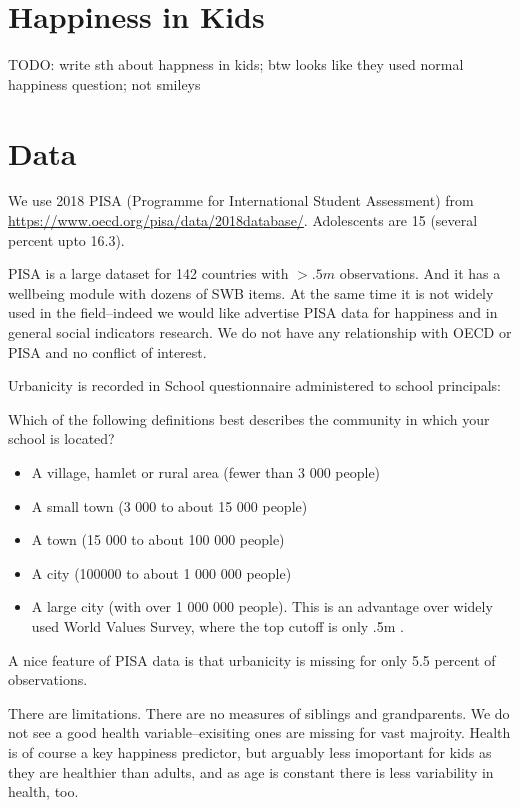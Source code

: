 \documentclass[10pt, letterpaper]{article}
\begin{document}
\begin{spacing}{1.4}
\section*{Happiness in Kids}

TODO: write sth about happness in kids; btw looks like they used normal happiness question; not smileys


\section*{Data}

We use 2018 PISA (Programme for International Student Assessment) from
\url{https://www.oecd.org/pisa/data/2018database/}. Adolescents are 15 (several percent upto 16.3).

PISA is a large dataset for 142 countries with $>.5m$ observations. And it has a
wellbeing module with dozens of SWB items. At the same time it is not widely
used in the field--indeed we would like advertise PISA data for happiness and in general social indicators
research. We do not have any relationship with OECD or PISA and no conflict of
interest. 

Urbanicity is recorded in  School questionnaire administered to school
principals:

Which of the following definitions best describes the community in which your school is located?
\begin{itemize}
\item A village, hamlet or rural area (fewer than 3 000 people)
\item A small town (3 000 to about 15 000 people)
\item A town (15 000 to about 100 000 people)
\item A city (100000 to about 1 000 000 people)
\item A large city (with over 1 000 000 people). This is an advantage over
  widely used World Values Survey, where the top cutoff is only .5m \cite{deb23,ebshoy24}.
\end{itemize}

A nice feature of PISA data is that urbanicity is missing for only 5.5 percent of
observations. 

There are limitations. There are no measures of siblings and grandparents.  
We do not see a good health variable--exisiting ones are
missing for vast majroity. Health is of course a key happiness predictor, but
arguably less imoportant for kids as they are healthier than adults, and as age
is constant there is less variability in health, too. 


\end{spacing}
\end{document}

